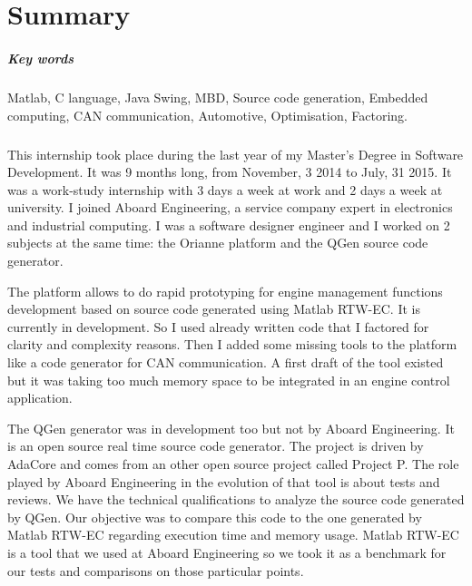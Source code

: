 \chapter*{Summary}

\paragraph*{Key words}
Matlab, C language, Java Swing, MBD, Source code generation, Embedded computing,
CAN communication, Automotive, Optimisation, Factoring.

\paragraph*{}
This internship took place during the last year of my Master's Degree in
Software Development. It was 9 months long, from November, 3 2014 to
July, 31 2015. It was a work-study internship with 3 days a week at work
and 2 days a week at university. I joined Aboard Engineering, a service company
expert in electronics and industrial computing. I was a software designer
engineer and I worked on 2 subjects at the same time: the Orianne platform and
the QGen source code generator.

The platform allows to do rapid prototyping for engine management functions
development based on source code generated using Matlab\up{\circledR}
RTW-EC\up{\circledR}.  It is currently in development. So I used already written
code that I factored for clarity and complexity reasons. Then I added some
missing tools to the platform like a code generator for CAN communication. A
first draft of the tool existed but it was taking too much memory space to be
integrated in an engine control application.

The QGen generator was in development too but not by Aboard Engineering. It is
an open source real time source code generator. The project is driven by AdaCore
and comes from an other open source project called Project P. The role played by
Aboard Engineering in the evolution of that tool is about tests and reviews. We
have the technical qualifications to analyze the source code generated by QGen.
Our objective was to compare this code to the one generated by
Matlab\up{\circledR} RTW-EC\up{\circledR} regarding execution time and memory
usage. Matlab\up{\circledR} RTW-EC\up{\circledR} is a tool that we used at
Aboard Engineering so we took it as a benchmark for our tests and comparisons on
those particular points.

